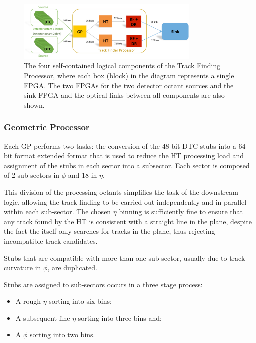 \begin{figure}[!h]
\centering
\includegraphics[width=0.78\textwidth]{figs/tk-upgrade/demoslice1.pdf}
\caption{The four self-contained logical components of the Track Finding Processor, where each box (block) in the diagram represents a single FPGA. The two FPGAs for the two detector octant sources and the sink FPGA and the optical links between all components are also shown.}
\label{fig:TFP}
\end{figure}

\subsubsection{Geometric Processor}\label{subsubsec:GP}
Each GP performs two tasks: the conversion of the 48-bit DTC stubs into a 64-bit format extended format that is used to reduce the HT processing load and assignment of the stubs in each sector into a subsector. 
Each sector is composed of 2 sub-sectors in $\phi$ and 18 in $\eta$.

This division of the processing octants simplifies the task of the downstream logic, allowing the track finding to be carried out independently and in parallel within each sub-sector. 
The chosen $\eta$ binning is sufficiently fine to ensure that any track found by the \rphi HT is consistent with a straight line in the \rz plane, despite the fact the \HT itself only searches for tracks in the \rphi plane, thus rejecting incompatible track candidates.

Stubs that are compatible with more than one sub-sector, usually due to track curvature in $\phi$, are duplicated. 

Stubs are assigned to sub-sectors occurs in a three stage process:
\begin{itemize}
\item A rough $\eta$ sorting into six bins;
\item A subsequent fine $\eta$ sorting into three bins and;
\item A $\phi$ sorting into two bins. 
\end{itemize}

